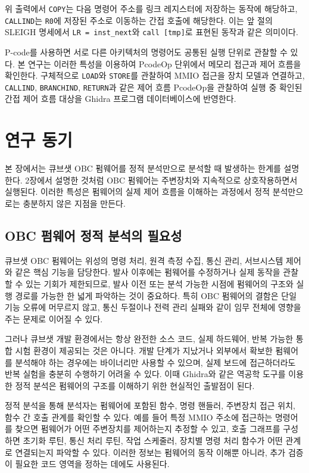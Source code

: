 \documentclass[master,korean,final]{kaist-ucs}
\begin{document}
위 출력에서 \texttt{COPY}는 다음 명령어 주소를 링크 레지스터에 저장하는 동작에 해당하고, \texttt{CALLIND}는 \texttt{R0}에 저장된 주소로 이동하는 간접 호출에 해당한다. 이는 앞 절의 SLEIGH 명세에서 \texttt{LR = inst\_next}와 \texttt{call [tmp]}로 표현된 동작과 같은 의미이다.

P-code를 사용하면 서로 다른 아키텍처의 명령어도 공통된 실행 단위로 관찰할 수 있다. 본 연구는 이러한 특성을 이용하여 PcodeOp 단위에서 메모리 접근과 제어 흐름을 확인한다. 구체적으로 \texttt{LOAD}와 \texttt{STORE}를 관찰하여 MMIO 접근을 장치 모델과 연결하고, \texttt{CALLIND}, \texttt{BRANCHIND}, \texttt{RETURN}과 같은 제어 흐름 PcodeOp을 관찰하여 실행 중 확인된 간접 제어 흐름 대상을 Ghidra 프로그램 데이터베이스에 반영한다.

\chapter{연구 동기}

본 장에서는 큐브샛 OBC 펌웨어를 정적 분석만으로 분석할 때 발생하는 한계를 설명한다. 2장에서 설명한 것처럼 OBC 펌웨어는 주변장치와 지속적으로 상호작용하면서 실행된다. 이러한 특성은 펌웨어의 실제 제어 흐름을 이해하는 과정에서 정적 분석만으로는 충분하지 않은 지점을 만든다.

\section{OBC 펌웨어 정적 분석의 필요성}

큐브샛 OBC 펌웨어는 위성의 명령 처리, 원격 측정 수집, 통신 관리, 서브시스템 제어와 같은 핵심 기능을 담당한다. 발사 이후에는 펌웨어를 수정하거나 실제 동작을 관찰할 수 있는 기회가 제한되므로, 발사 이전 또는 분석 가능한 시점에 펌웨어의 구조와 실행 경로를 가능한 한 넓게 파악하는 것이 중요하다. 특히 OBC 펌웨어의 결함은 단일 기능 오류에 머무르지 않고, 통신 두절이나 전력 관리 실패와 같이 임무 전체에 영향을 주는 문제로 이어질 수 있다.

그러나 큐브샛 개발 환경에서는 항상 완전한 소스 코드, 실제 하드웨어, 반복 가능한 통합 시험 환경이 제공되는 것은 아니다. 개발 단계가 지났거나 외부에서 확보한 펌웨어를 분석해야 하는 경우에는 바이너리만 사용할 수 있으며, 실제 보드에 접근하더라도 반복 실험을 충분히 수행하기 어려울 수 있다. 이때 Ghidra와 같은 역공학 도구를 이용한 정적 분석은 펌웨어의 구조를 이해하기 위한 현실적인 출발점이 된다.

정적 분석을 통해 분석자는 펌웨어에 포함된 함수, 명령 핸들러, 주변장치 접근 위치, 함수 간 호출 관계를 확인할 수 있다. 예를 들어 특정 MMIO 주소에 접근하는 명령어를 찾으면 펌웨어가 어떤 주변장치를 제어하는지 추정할 수 있고, 호출 그래프를 구성하면 초기화 루틴, 통신 처리 루틴, 작업 스케줄러, 장치별 명령 처리 함수가 어떤 관계로 연결되는지 파악할 수 있다. 이러한 정보는 펌웨어의 동작 이해뿐 아니라, 추가 검증이 필요한 코드 영역을 정하는 데에도 사용된다.
\end{document}
